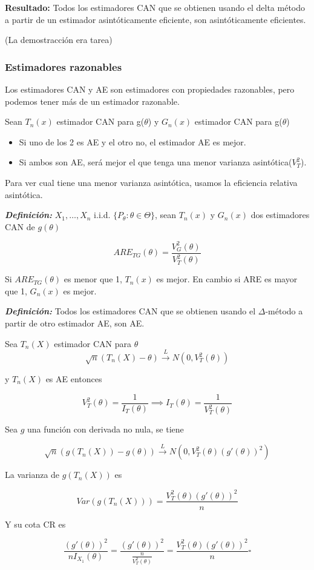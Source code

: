 \textbf{Resultado: }Todos los estimadores CAN que se obtienen usando el delta método a partir de un estimador asintóticamente eficiente,
son asintóticamente eficientes.

(La demostracción era tarea)

\subsubsection{Estimadores razonables}

Los estimadores CAN y AE son estimadores con propiedades razonables, pero podemos tener más de un estimador razonable.

Sean $T_n(x)$ estimador CAN para g($\theta$) y $G_n(x)$ estimador CAN para g($\theta$)
\begin{itemize}
    \item Si uno de los 2 es AE y el otro no, el estimador AE es mejor.
    \item Si ambos son AE, será mejor el que tenga una menor varianza asintótica($V_T^2$).
\end{itemize}

Para ver cual tiene una menor varianza asintótica, usamos la eficiencia relativa asintótica.

\textbf{\textit{Definición: }} $X_1,\dots,X_n$ i.i.d. $\{ P_\theta: \theta \in \Theta \}$, sean $T_n(x)$
y $G_n(x)$ dos estimadores CAN de $g(\theta)$

\[
    ARE_{TG}(\theta)=\frac{V_G^2(\theta)}{V_T^2(\theta)}
\]

Si $ARE_{TG}(\theta)$ es menor que 1, $T_n(x)$ es mejor. En cambio si ARE es mayor que 1, $G_n(x)$ es mejor.

\newpage

\textbf{\textit{Definición: }} Todos los estimadores CAN que se obtienen usando el $\Delta$-método a partir de otro estimador AE, son AE.

\begin{proofs}
    Sea $T_n(X)$ estimador CAN para $\theta$
    \[
        \sqrt{n}(T_n(X)-\theta) \overset{L}{\to}N(0,V^2_T(\theta))
    \]

    y $T_n(X)$ es AE entonces

    \[
        V^2_T(\theta) = \frac{1}{I_T(\theta)} \implies I_T(\theta)=\frac{1}{V^2_T(\theta)}
    \]

    Sea $g$ una función con derivada no nula, se tiene

    \[
        \sqrt{n}(g(T_n(X))-g(\theta)) \overset{L}{\to}N(0,V^2_T(\theta)(g'(\theta))^2)
    \]

    La varianza de $g(T_n(X))$ es

    \[
        Var(g(T_n(X)))=\frac{V^2_T(\theta)(g'(\theta))^2}{n}
    \]

    Y su cota CR es

    \[
        \frac{(g'(\theta))^2}{nI_{X_1}(\theta)}=\frac{(g'(\theta))^2}{\frac{n}{V^2_T(\theta)}}=\frac{V^2_T(\theta)(g'(\theta))^2}{n}\square
    \]
\end{proofs}
